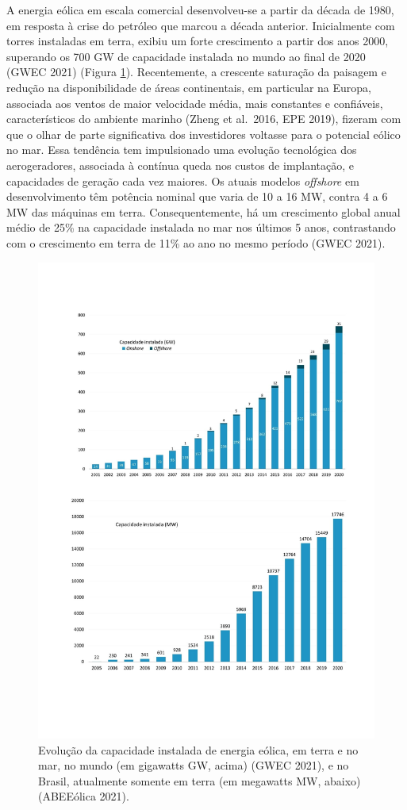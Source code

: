 \documentclass[
  oneside]{scrbook}
\begin{document}
A energia eólica em escala comercial desenvolveu-se a partir da década de 1980, em resposta à crise do petróleo que marcou a década anterior. Inicialmente com torres instaladas em terra, exibiu um forte crescimento a partir dos anos 2000, superando os 700 GW de capacidade instalada no mundo ao final de 2020 (GWEC 2021) (Figura \ref{fig:61}). Recentemente, a crescente saturação da paisagem e redução na disponibilidade de áreas continentais, em particular na Europa, associada aos ventos de maior velocidade média, mais constantes e confiáveis, característicos do ambiente marinho (Zheng et al.~2016, EPE 2019), fizeram com que o olhar de parte significativa dos investidores voltasse para o potencial eólico no mar. Essa tendência tem impulsionado uma evolução tecnológica dos aerogeradores, associada à contínua queda nos custos de implantação, e capacidades de geração cada vez maiores. Os atuais modelos \emph{offshore} em desenvolvimento têm potência nominal que varia de 10 a 16 MW, contra 4 a 6 MW das máquinas em terra. Consequentemente, há um crescimento global anual médio de 25\% na capacidade instalada no mar nos últimos 5 anos, contrastando com o crescimento em terra de 11\% ao ano no mesmo período (GWEC 2021).

\begin{figure}[H]

{\centering \includegraphics[width=0.75\linewidth]{imagens/cap08/Figura_8.1ab} 

}

\caption{Evolução da capacidade instalada de energia eólica, em terra e no mar, no mundo (em gigawatts GW, acima) (GWEC 2021), e no Brasil, atualmente somente em terra (em megawatts MW, abaixo) (ABEEólica 2021).}\label{fig:61}
\end{figure}
\end{document}
